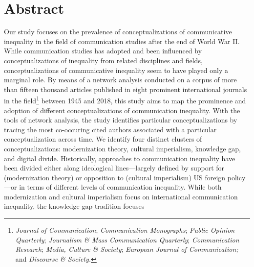 \documentclass{tufte-handout}
\begin{document}
\begin{titlepage}
\begin{fullwidth}
\end{fullwidth}

\vspace*{1em}


\hypertarget{abstract}{%
\section{Abstract}\label{abstract}}

Our study focuses on the prevalence of conceptualizations of
communicative inequality in the field of communication studies after the
end of World War II. While communication studies has adopted and been
influenced by conceptualizations of inequality from related disciplines
and fields, conceptualizations of communicative inequality seem to have
played only a marginal role. By means of a network analysis conducted on
a corpus of more than fifteen thousand articles published in eight
prominent international journals in the field\footnote{\emph{Journal of
  Communication}; \emph{Communication Monographs}; \emph{Public Opinion
  Quarterly}; \emph{Journalism \& Mass Communication Quarterly};
  \emph{Communication Research}; \emph{Media, Culture \& Society};
  \emph{European Journal of Communication;} and \emph{Discourse \&
  Society.}} between 1945 and 2018, this study aims to map the
prominence and adoption of different conceptualizations of communication
inequality. With the tools of network analysis, the study identifies
particular conceptualizations by tracing the most co-occuring cited
authors associated with a particular conceptualization across time. We
identify four distinct clusters of conceptualizations: modernization
theory, cultural imperialism, knowledge gap, and digital divide.
Historically, approaches to communication inequality have been divided
either along ideological lines---largely defined by support for
(modernization theory) or opposition to (cultural imperialism) US
foreign policy---or in terms of different levels of communication
inequality. While both modernization and cultural imperialism focus on
international communication inequality, the knowledge gap tradition
focuses

\enlargethispage{2\baselineskip}

\vspace*{2em}



 \end{titlepage}
\end{document}
